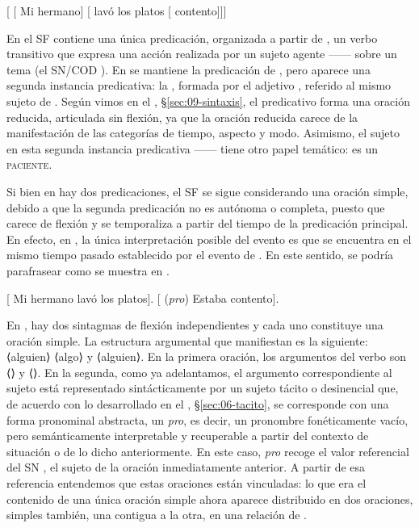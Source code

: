 \begin{exe}
  \ex\label{ex:12-hermano2} {}[ [ Mi hermano]
      [ lavó los platos [ contento]]]
\end{exe}

En  el SF contiene una única predicación, organizada a
partir de , un verbo transitivo que expresa una acción realizada
por un sujeto agente ------ sobre un tema (el SN/COD ). En  se mantiene la predicación de
, pero aparece una segunda instancia predicativa: la
, formada por el adjetivo ,
referido al mismo sujeto de . Según vimos en el
, §\ref{sec:09-sintaxis}, el predicativo forma una oración reducida,
articulada sin flexión, ya que la oración reducida carece de la manifestación de
las categorías de tiempo, aspecto y modo. Asimismo, el sujeto en esta segunda
instancia predicativa ------ tiene otro papel temático:
es un \textsc{paciente}.

Si bien en  hay dos predicaciones, el SF se sigue
considerando una oración simple, debido a que la segunda predicación no es
autónoma o completa, puesto que carece de flexión y se temporaliza a partir del
tiempo de la predicación principal. En efecto, en , la
única interpretación posible del evento  es que se
encuentra en el mismo tiempo pasado establecido por el evento de .
En este sentido,  se podría parafrasear como se muestra en
.

\begin{exe}
  \ex\label{ex:12-hermano3} {}[ Mi hermano lavó los platos].
      [ (\textit{pro}) Estaba contento].
\end{exe}

En , hay dos sintagmas de flexión independientes y cada uno
constituye una oración simple. La estructura argumental que manifiestan es la
siguiente:  ⟨alguien⟩ ⟨algo⟩ y  ⟨alguien⟩. En
la primera oración, los argumentos del verbo son ⟨⟩ y
⟨⟩. En la segunda, como ya adelantamos, el argumento
correspondiente al sujeto está representado sintácticamente por un sujeto tácito
o desinencial que, de acuerdo con lo desarrollado en el ,
§\ref{sec:06-tacito}, se corresponde con una forma pronominal abstracta, un
\textit{pro}, es decir, un pronombre fonéticamente vacío, pero semánticamente
interpretable y recuperable a partir del contexto de situación o de lo dicho
anteriormente. En este caso, \textit{pro} recoge el valor referencial del SN
, el sujeto de la oración inmediatamente anterior. A partir de
esa referencia entendemos que estas oraciones están vinculadas: lo que era el
contenido de una única oración simple  ahora aparece
distribuido en dos oraciones, simples también, una contigua a la otra, en una
relación de .

